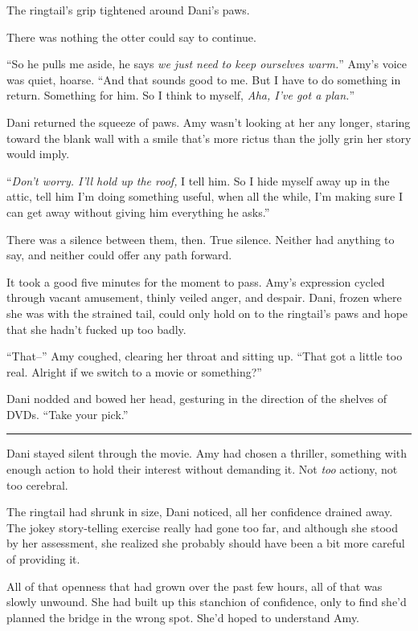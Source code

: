 The ringtail's grip tightened around Dani's paws.

There was nothing the otter could say to continue.

``So he pulls me aside, he says \emph{we just need to keep ourselves warm.}'' Amy's voice was quiet, hoarse. ``And that sounds good to me. But I have to do something in return. Something for him. So I think to myself, \emph{Aha, I've got a plan.}''

Dani returned the squeeze of paws. Amy wasn't looking at her any longer, staring toward the blank wall with a smile that's more rictus than the jolly grin her story would imply.

``\emph{Don't worry. I'll hold up the roof,} I tell him. So I hide myself away up in the attic, tell him I'm doing something useful, when all the while, I'm making sure I can get away without giving him everything he asks.''

There was a silence between them, then. True silence. Neither had anything to say, and neither could offer any path forward.

It took a good five minutes for the moment to pass. Amy's expression cycled through vacant amusement, thinly veiled anger, and despair. Dani, frozen where she was with the strained tail, could only hold on to the ringtail's paws and hope that she hadn't fucked up too badly.

``That--'' Amy coughed, clearing her throat and sitting up. ``That got a little too real. Alright if we switch to a movie or something?''

Dani nodded and bowed her head, gesturing in the direction of the shelves of DVDs. ``Take your pick.''

\begin{center}\rule{0.5\linewidth}{\linethickness}\end{center}

Dani stayed silent through the movie. Amy had chosen a thriller, something with enough action to hold their interest without demanding it. Not \emph{too} actiony, not too cerebral.

The ringtail had shrunk in size, Dani noticed, all her confidence drained away. The jokey story-telling exercise really had gone too far, and although she stood by her assessment, she realized she probably should have been a bit more careful of providing it.

All of that openness that had grown over the past few hours, all of that was slowly unwound. She had built up this stanchion of confidence, only to find she'd planned the bridge in the wrong spot. She'd hoped to understand Amy.


